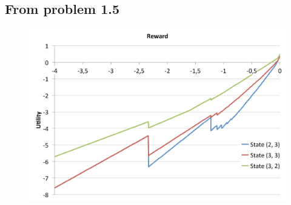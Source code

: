 \documentclass[letterpaper, 10pt]{article}
\begin{document}
\clearpage

\subsection{From problem 1.5}
\label{ssec:prob15fig}
\vfill
\begin{figure}[h]
	\centering
	\includegraphics[width=\textwidth]{prob15}
	\caption{}
	\label{fig:prob15}
\end{figure}
\vfill
\end{document}
